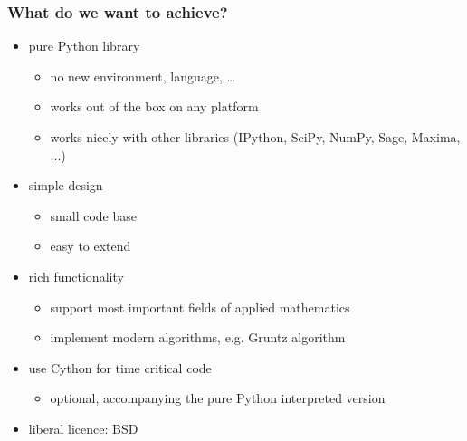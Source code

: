 \documentclass{beamer}
\begin{document}
\begin{frame}[fragile]
    \frametitle{What do we want to achieve?}

    \begin{itemize}
        \item<1-> pure Python library
            \begin{itemize}
                \item no new environment, language, \ldots
                \item works out of the box on any platform
                \item works nicely with other libraries (IPython, SciPy, NumPy, Sage, Maxima, ...)
            \end{itemize}
        \item<2-> simple design
            \begin{itemize}
                \item small code base
                \item easy to extend
            \end{itemize}
        \item<3-> rich functionality
            \begin{itemize}
                \item support most important fields of applied mathematics
                \item implement modern algorithms, e.g. Gruntz algorithm
            \end{itemize}
        \item<4-> use Cython for time critical code
            \begin{itemize}
                \item optional, accompanying the pure Python interpreted version
            \end{itemize}
        \item<5-> liberal licence: BSD
    \end{itemize}
\end{frame}
\end{document}
